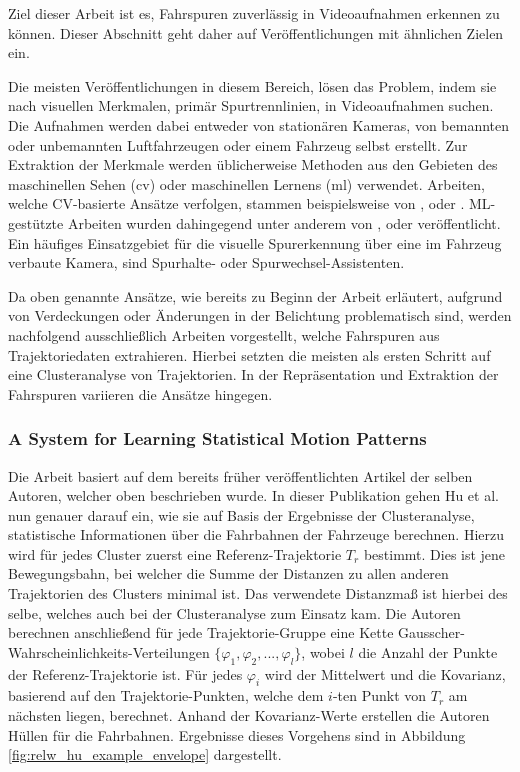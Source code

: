 Ziel dieser Arbeit ist es, Fahrspuren zuverlässig in Videoaufnahmen erkennen zu können. Dieser Abschnitt
geht daher auf Veröffentlichungen mit ähnlichen Zielen ein.

Die meisten Veröffentlichungen in diesem Bereich, lösen das Problem, indem sie nach visuellen Merkmalen,
primär Spurtrennlinien, in Videoaufnahmen suchen. Die Aufnahmen werden dabei entweder von stationären Kameras,
von bemannten oder unbemannten Luftfahrzeugen oder einem Fahrzeug selbst erstellt. Zur Extraktion der Merkmale werden
üblicherweise Methoden aus den Gebieten des maschinellen Sehen (\acrshort*{cv}) oder maschinellen Lernens (\acrshort*{ml}) verwendet.
Arbeiten, welche CV-basierte Ansätze verfolgen, stammen beispielsweise von \cite[]{Lai2000}, \cite[]{McCall2006} oder \cite[]{Aly2008}.
ML-gestützte Arbeiten wurden dahingegend unter anderem von \cite[]{Kim2008}, \cite[]{Gopalan2012} oder
\cite[]{Neven2018} veröffentlicht.
Ein häufiges Einsatzgebiet für die visuelle Spurerkennung über eine im Fahrzeug verbaute Kamera, sind Spurhalte- oder
Spurwechsel-Assistenten.

Da oben genannte Ansätze, wie bereits zu Beginn der Arbeit erläutert, aufgrund von Verdeckungen oder Änderungen
in der Belichtung problematisch sind, werden nachfolgend ausschließlich Arbeiten vorgestellt, welche Fahrspuren
aus Trajektoriedaten extrahieren. Hierbei setzten die meisten als ersten Schritt auf eine Clusteranalyse von Trajektorien.
In der Repräsentation und Extraktion der Fahrspuren variieren die Ansätze hingegen.

\subsubsection*{A System for Learning Statistical Motion Patterns}
Die Arbeit \cite[]{WeimingHu2006} basiert auf dem bereits früher veröffentlichten Artikel \cite[]{Hu2005} der selben Autoren,
welcher oben beschrieben wurde. In dieser Publikation gehen Hu et al. nun genauer darauf ein, wie sie auf Basis
der Ergebnisse der Clusteranalyse, statistische Informationen über die Fahrbahnen der Fahrzeuge berechnen.
Hierzu wird für jedes Cluster zuerst eine Referenz-Trajektorie $T_r$ bestimmt. Dies ist jene Bewegungsbahn,
bei welcher die Summe der Distanzen zu allen anderen Trajektorien des Clusters minimal ist. Das verwendete
Distanzmaß ist hierbei des selbe, welches auch bei der Clusteranalyse zum Einsatz kam.
Die Autoren berechnen anschließend für jede Trajektorie-Gruppe eine Kette Gausscher-Wahrscheinlichkeits-Verteilungen
$\{ \varphi_1, \varphi_2, ..., \varphi_l \}$, wobei $l$ die Anzahl der Punkte der Referenz-Trajektorie ist.
Für jedes $\varphi_i$ wird der Mittelwert und die Kovarianz, basierend auf den Trajektorie-Punkten, welche dem
$i$-ten Punkt von $T_r$ am nächsten liegen, berechnet.
Anhand der Kovarianz-Werte erstellen die Autoren Hüllen für die Fahrbahnen. Ergebnisse dieses Vorgehens sind in
Abbildung \ref{fig:relw_hu_example_envelope} dargestellt.

